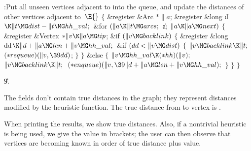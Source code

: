 \Y\B\4:Put all unseen vertices adjacent to  into the queue, and
update the distances of other vertices adjacent to~\X${}\E{}$\6
${}\{{}$\5
\1\&{register} \&{Arc} ${}{*}\|a{}$;\6
\&{register} \&{long} \|d${}\K\|t\MG\\{dist}-\|t\MG\\{hh\_val};{}$\7
\&{for} ${}(\|a\K\|t\MG\\{arcs};{}$ \|a; ${}\|a\K\|a\MG\\{next}){}$\5
${}\{{}$\1\6
\&{register} \&{Vertex} ${}{*}\|v\K\|a\MG\\{tip}{}$;\7
\&{if} ${}(\|v\MG\\{backlink}){}$\5
${}\{{}$\1\6
\&{register} \&{long} \\{dd}${}\K\|d+\|a\MG\\{len}+\|v\MG\\{hh\_val};{}$\7
\&{if} ${}(\\{dd}<\|v\MG\\{dist}){}$\5
${}\{{}$\1\6
${}\|v\MG\\{backlink}\K\|t;{}$\6
${}({*}\\{requeue})(\|v,\39\\{dd}){}$;\6
\4${}\}{}$\2\6
\4${}\}{}$\5
\2\&{else}\5
${}\{{}$\1\6
${}\|v\MG\\{hh\_val}\K({*}\\{hh})(\|v);{}$\6
${}\|v\MG\\{backlink}\K\|t;{}$\6
${}({*}\\{enqueue})(\|v,\39\|d+\|a\MG\\{len}+\|v\MG\\{hh\_val});{}$\6
\4${}\}{}$\2\6
\4${}\}{}$\2\6
\4${}\}{}$\2\par
\U9.\fi

The  fields don't contain true distances in the graph; they
represent distances modified by the heuristic function. The true distance
from  to vertex  is .

When printing the results, we show true distances. Also, if a nontrivial
heuristic is being used, we give the  value in brackets; the user
can then
observe that vertices are becoming known in order of true distance
plus  value.

